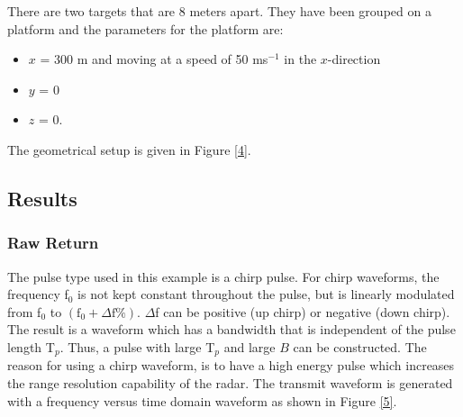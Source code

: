 \smallskip There are two targets that are 8 meters apart. They have been
grouped on a platform and the parameters for the platform are:

\begin{itemize}
\begin{itemize}
\item  $x$ = 300 m and moving at a speed of 50 ms$^{-1}$ in the $x$-direction

\item  $y$ = 0

\item  $z$ = 0.
\end{itemize}
\end{itemize}

The geometrical setup is given in Figure \ref{4}.


\subsection{Results}

\subsubsection{Raw Return}

\smallskip The pulse type used in this example is a chirp pulse. For chirp
waveforms, the frequency f$_{0}$ is not kept constant throughout the pulse,
but is linearly modulated from f$_{0}$ to $\left( \text{f}_{0}+\Delta \text{f%
}\right) $. $\Delta $f can be positive (up chirp) or negative (down chirp).
The result is a waveform which has a bandwidth that is independent of the
pulse length T$_{p}$. Thus, a pulse with large T$_{p}$ and large $B$ can be
constructed. The reason for using a chirp waveform, is to have a high energy
pulse which increases the range resolution capability of the radar. The
transmit waveform is generated with a frequency versus time domain waveform
as shown in Figure \ref{5}.


